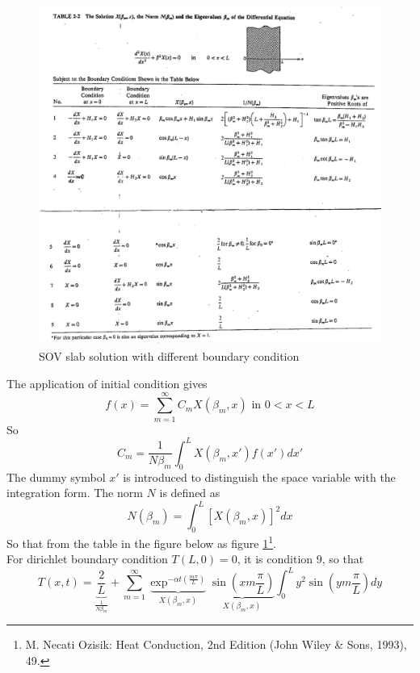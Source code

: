 \begin{solution}
\begin{figure}[H]
  \centering
    \includegraphics[scale=0.6]{figures/ch4/7}
    \caption{SOV slab solution with different boundary condition}
    \label{fig:4:7}
\end{figure}

The application of initial condition gives
$$f(x)=\sum_{m=1}^{\infty} C_m X(\beta_m,x) \text{ in } 0<x<L$$
So 
$$C_m=\frac{1}{N\beta_m}\int_0^L X(\beta_m,x')f(x')dx'$$
The dummy symbol $x'$ is introduced to distinguish the space variable with the integration form. The norm $N$ is defined as
$$N(\beta_m)=\int_0^L [X(\beta_m,x)]^2dx$$
So that from the table in the figure below as figure {\ref{fig:4:7}}\footnote{M. Necati Ozisik: Heat Conduction, 2nd Edition (John Wiley \& Sons, 1993), 49.}.\\
For dirichlet boundary condition $T(L,0)=0$, it is condition 9, so that
\[
 T(x,t) = 
   \underbrace{\frac{2}{L}}_{\frac{1}{N\beta_m}} +\sum_{m=1}^{\infty}
   \underbrace{\exp^{-\alpha t \left(\frac{m\pi}{L}\right)}}_{X(\beta_m,x)}
   \underbrace{\sin\left(xm\frac{\pi}{L}\right)}_{X(\beta_m,x)}
   \int_0^L{y^2 \sin\left(ym\frac{\pi}{L}\right)}dy
\]


\end{solution}
